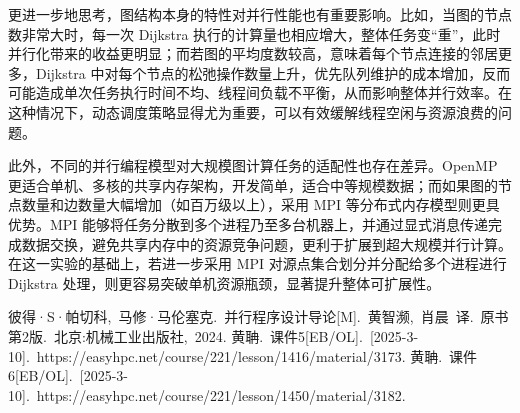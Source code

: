 \documentclass[a4paper, utf8]{ctexart}
\begin{document}
	更进一步地思考，图结构本身的特性对并行性能也有重要影响。比如，当图的节点数非常大时，每一次 Dijkstra 执行的计算量也相应增大，整体任务变“重”，此时并行化带来的收益更明显；而若图的平均度数较高，意味着每个节点连接的邻居更多，Dijkstra 中对每个节点的松弛操作数量上升，优先队列维护的成本增加，反而可能造成单次任务执行时间不均、线程间负载不平衡，从而影响整体并行效率。在这种情况下，动态调度策略显得尤为重要，可以有效缓解线程空闲与资源浪费的问题。
	
	此外，不同的并行编程模型对大规模图计算任务的适配性也存在差异。OpenMP 更适合单机、多核的共享内存架构，开发简单，适合中等规模数据；而如果图的节点数量和边数量大幅增加（如百万级以上），采用 MPI 等分布式内存模型则更具优势。MPI 能够将任务分散到多个进程乃至多台机器上，并通过显式消息传递完成数据交换，避免共享内存中的资源竞争问题，更利于扩展到超大规模并行计算。在这一实验的基础上，若进一步采用 MPI 对源点集合划分并分配给多个进程进行 Dijkstra 处理，则更容易突破单机资源瓶颈，显著提升整体可扩展性。
	
	\let\cleardoublepage\clearpage
	
	\begin{thebibliography}{99}  
		 彼得·S·帕切科,\ 马修·马伦塞克.\ 并行程序设计导论[M].\ 黄智濒,\ 肖晨\ 译.\ 原书第2版.\ 北京:机械工业出版社,\ 2024.
		 黄聃.\ 课件5[EB/OL].\ [2025-3-10].\ https://easyhpc.net/course/221/lesson/1416/material/3173.
		 黄聃.\ 课件6[EB/OL].\ [2025-3-10].\ https://easyhpc.net/course/221/lesson/1450/material/3182.
	\end{thebibliography}
	
\end{document}

